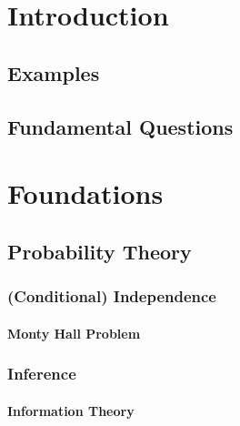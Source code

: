 \chapter{Introduction} %

    \section{Examples} %

    \section{Fundamental Questions} %

\chapter{Foundations} %

    \section{Probability Theory} %

        \subsection{(Conditional) Independence} %

            \subsubsection{Monty Hall Problem} %

        \subsection{Inference} %

            \subsubsection{Information Theory} %


